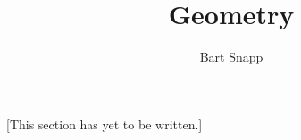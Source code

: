 \documentclass{article}
\author{Bart Snapp}
\title{Geometry}
\begin{document}
\begin{abstract}
\end{abstract}
\maketitle

[This section has yet to be written.]
\end{document}
